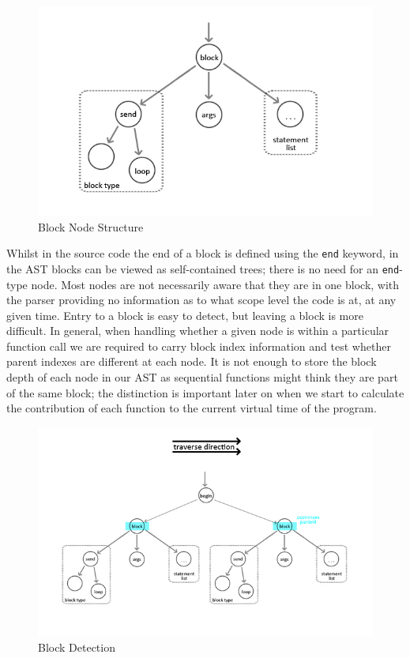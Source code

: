 \documentclass[11pt, abstracton, twoside]{scrartcl}
\begin{document}
\begin{figure}[h!]
	\centering
	\includegraphics[width=\textwidth]{images/Block.jpg}
	\caption{Block Node Structure} \label{blocks}
\end{figure}

Whilst in the source code the end of a block is defined using the \texttt{end}
keyword, in the AST blocks can be viewed as self-contained trees; there is
no need for an \texttt{end}-type node. Most nodes are not necessarily aware
that they are in one block, with the parser providing no information
as to what scope level the code is at, at any given time. Entry to a block is
easy to detect, but leaving a block is more difficult. In general, when handling
whether a given node is within a particular function call we are required to
carry block index information and test whether parent indexes are different
at each node. It is not enough to store the block depth of each node in our AST
as sequential functions might think they are part of the same block; the
distinction is important later on when we start to calculate the contribution
of each function to the current virtual time of the program.

\begin{figure}[h!]
	\centering
	\includegraphics[width=\textwidth]{images/BlkDetection.jpg}
	\caption{Block Detection} \label{blockdetect}
\end{figure}
\end{document}
